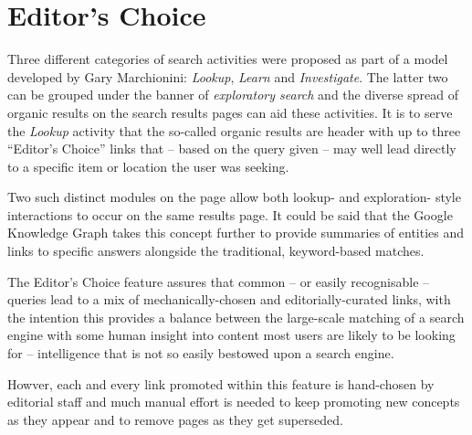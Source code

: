 \section{Editor's Choice}

Three different categories of search activities were proposed
as part of a model developed by
Gary Marchionini\cite{marchionini2006exploratory}:
\emph{Lookup}, \emph{Learn} and \emph{Investigate}. The
latter two can be grouped under the banner of \emph{exploratory search}
and the diverse spread of organic results on the search results pages
can aid these activities. It is to serve the \emph{Lookup} activity
that the so-called organic results are header with up to three
``Editor's Choice'' links that -- based on the query given -- may
well lead directly to a specific item or location the user was seeking.

Two such distinct modules on the page allow both lookup- and exploration-
style interactions to occur on the same results page. It could be said
that the Google Knowledge Graph\cite{singhal2012introducing} takes
this concept further to provide summaries of entities and links to
specific answers alongside the traditional, keyword-based matches.

The Editor's Choice feature assures that common -- or easily recognisable -- queries
lead to a mix of mechanically-chosen and editorially-curated links,
with the intention this provides a balance between the large-scale
matching of a search engine with some human insight into content
most users are likely to be looking for -- intelligence that is not
so easily bestowed upon a search engine.

Howver, each and every link promoted within this feature is hand-chosen by editorial
staff and much manual effort is needed to keep promoting new concepts
as they appear and to remove pages as they get superseded.

